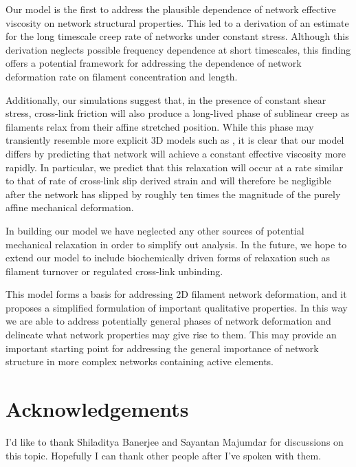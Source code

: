 \documentclass[pre,preprint]{revtex4-1}
\begin{document}
Our model is the first to address the plausible dependence of network effective viscosity on network structural properties.  This led to a derivation of an estimate for the long timescale creep rate of networks under constant stress.  Although this derivation neglects possible frequency dependence at short timescales, this finding offers a potential framework for addressing the dependence of network deformation rate on filament concentration and length.

Additionally, our simulations suggest that, in the presence of constant shear stress, cross-link friction will also produce a long-lived phase of sublinear creep as filaments relax from their affine stretched position. While this phase may transiently resemble more explicit 3D models such as \cite{theo_crosslinkslip1}, it is clear that our model differs by predicting that network will achieve a constant effective viscosity more rapidly.  In particular, we predict that this relaxation will occur at a rate similar to that of rate of cross-link slip derived strain and will therefore be negligible after the network has slipped by roughly ten times the magnitude of the purely affine mechanical deformation.  

In building our model we have neglected any other sources of potential mechanical relaxation in order to simplify out analysis. In the future, we hope to extend our model to include biochemically driven forms of relaxation such as filament turnover or regulated cross-link unbinding.

This model forms a basis for addressing 2D filament network deformation, and it proposes a simplified formulation of important qualitative properties. In this way we are able to address potentially general phases of network deformation and delineate what network properties may give rise to them.  This may provide an important starting point for addressing the general importance of network structure in more complex networks containing active elements. 



















\section{Acknowledgements}
I'd like to thank Shiladitya Banerjee and Sayantan Majumdar for discussions on this topic.  Hopefully I can thank other people after I've spoken with them.
\end{document}

